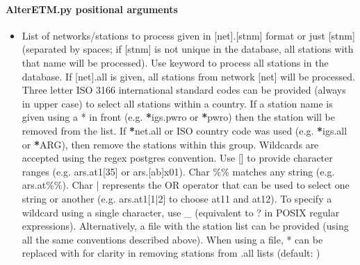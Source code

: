 \documentclass[letterpaper,10pt,english]{sphinxmanual}
\begin{document}
\paragraph{AlterETM.py positional arguments}
\label{\detokenize{com:AlterETM.py-positional-arguments}}\begin{itemize}
\item {} 
\sphinxAtStartPar
{\hyperref[\detokenize{com:AlterETM.py-all|net.stnm}]{}} \sphinxhyphen{} List of networks/stations to process given in {[}net{]}.{[}stnm{]} format or just {[}stnm{]} (separated by spaces; if {[}stnm{]} is not unique in the database, all stations with that name will be processed). Use keyword  to process all stations in the database. If {[}net{]}.all is given, all stations from network {[}net{]} will be processed. Three letter ISO 3166 international standard codes can be provided (always in upper case) to select all stations within a country. If a station name is given using a * in front (e.g. {\color{red}\bfseries{}*}igs.pwro or {\color{red}\bfseries{}*}pwro) then the station will be removed from the list. If {\color{red}\bfseries{}*}net.all or ISO country code was used (e.g. {\color{red}\bfseries{}*}igs.all or {\color{red}\bfseries{}*}ARG), then remove the stations within this group. Wildcards are accepted using the regex postgres convention. Use {[}{]} to provide character ranges (e.g. ars.at1{[}3\sphinxhyphen{}5{]} or ars.{[}a\sphinxhyphen{}b{]}x01). Char \%\% matches any string (e.g. ars.at\%\%). Char | represents the OR operator that can be used to select one string or another (e.g. ars.at1{[}1|2{]} to choose at11 and at12). To specify a wildcard using a single character, use \_ (equivalent to ? in POSIX regular expressions). Alternatively, a file with the station list can be provided (using all the same conventions described above). When using a file, * can be replaced with \sphinxhyphen{} for clarity in removing stations from .all lists (default: )

\end{itemize}
\end{document}
